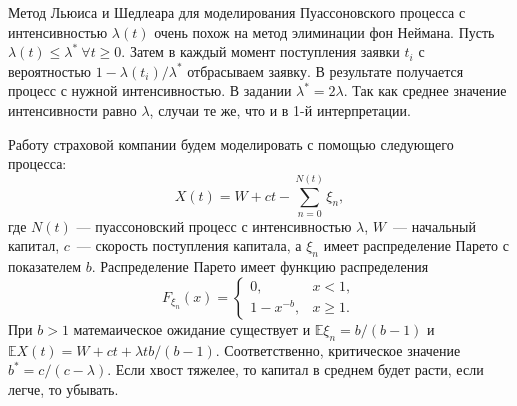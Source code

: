 \documentclass[12pt, a4paper]{article} %
\renewcommand{\le}{\leqslant}
\renewcommand{\ge}{\geqslant}
\begin{document}
Метод Льюиса и Шедлеара для моделирования Пуассоновского процесса с интенсивностью $\lambda(t)$ очень похож на метод элиминации фон Неймана.
Пусть $\lambda(t)  \le \lambda^*\ \forall t \ge 0$.
Затем в каждый момент поступления заявки $t_i$ с вероятностью  $1 - \lambda(t_i) \big/ \lambda^*$ отбрасываем заявку.
В результате получается процесс с нужной интенсивностью.
В задании  $\lambda^* = 2\lambda$. 
Так как среднее значение интенсивности равно $\lambda$, случаи те же, что и в 1-й интерпретации.

Работу страховой компании будем моделировать с помощью следующего процесса:
$$
X(t) = W + ct - \sum\limits_{n=0}^{N(t)} \xi_n,
$$
где $N(t)$ — пуассоновский процесс с интенсивностью $\lambda$, $W$~--- начальный капитал,
$c$~--- скорость поступления капитала, а $\xi_n$ имеет распределение Парето с показателем $b$.
Распределение Парето имеет функцию распределения 
\[
F_{\xi_n}(x) = 
    \begin{cases}
        0, & x < 1, \\
        1 - x^{-b}, & x \ge 1.
    \end{cases} 
\] 
При $b > 1$ матемаическое ожидание существует и $\mathbb{E}\xi_n = b \big/ (b - 1)$ и $\mathbb{E} X(t) = W + ct +\lambda t b \big/ (b - 1)$.
Соответственно, критическое значение $b^* = c \big/ (c - \lambda)$.
Если хвост тяжелее, то капитал в среднем будет расти, если легче, то убывать.
\end{document}
